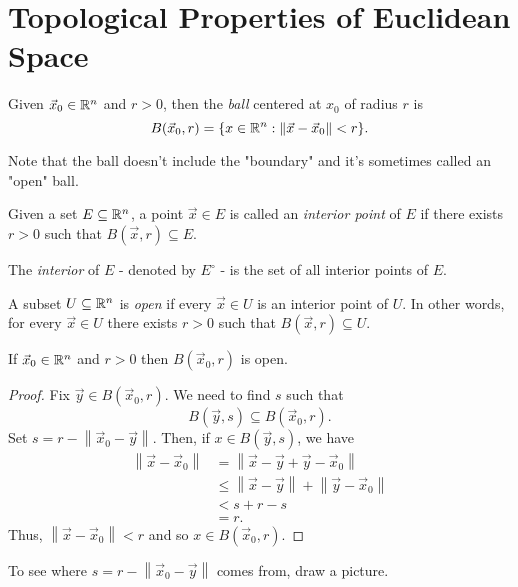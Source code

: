 \documentclass[11pt]{article}
\newcommand{\x}{\vec{x}}
\newcommand{\norm}[1]{\left\lVert #1 \right\rVert}
\newcommand{\y}{\vec{y}}
\begin{document}
\section{Topological Properties of Euclidean Space}

\begin{definition}
    Given $\x_0 \in \R^n$ and $r> 0$, then the \textit{ball} centered at $x_0$ of radius $r$ is \[B(\x_0,r) = \{x \in \R^n: \norm{\x - \x_0 } < r\}.\]
\end{definition}

\begin{remark}
    Note that the ball doesn't include the "boundary" and it's sometimes called an "open" ball.
\end{remark}

\begin{definition}
    Given a set $E \subseteq \mathbb{R}^n$, a point $\x \in E$ is called an \textit{interior point} of $E$ if there exists $r > 0$ such that $B(\x,r) \subseteq E$. 
\end{definition}

\begin{definition}
    The \textit{interior} of $E$ - denoted by $E^{\circ}$ - is the set of all interior points of $E$.
\end{definition}
\begin{definition}
    A subset $U \subseteq \mathbb{R}^n$ is \textit{open} if every $\x \in U$ is an interior point of $U$. In other words, for every $\x \in U$ there exists $r > 0$ such that $B(\x, r) \subseteq U$. 
\end{definition}

\begin{example}
    If $\x_0 \in \R^n$ and $r >0$ then $B(\x_0,r)$ is open. 
    \begin{proof} 
        Fix $\y \in B(\x_0, r)$. We need to find $s$ such that \[B(\y,s) \subseteq B(\x_0,r).\]
        Set $s = r - \norm{\x_0 - \y}$. Then, if $x \in B(\y, s)$, we have \begin{align} \norm{\x - \x_0} &= \norm{\x - \y + \y - \x_0} \\ &\leq \norm{\x - \y} + \norm{\y - \x_0} \\ &< s+ r - s \\ &= r. \end{align}
        Thus, $\norm{\x - \x_0} < r$ and so $x \in B(\x_0, r)$. 
    \end{proof}
    \begin{remark}
        To see where $s = r - \norm{\x_0 - \y}$ comes from, draw a picture. 
    \end{remark}
\end{example}
\end{document}
